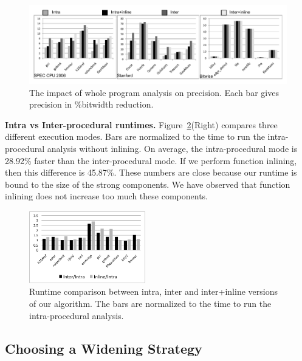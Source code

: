 \documentclass{llncs}
\begin{document}
\begin{figure}[t!]
\begin{center}
\includegraphics[width=\textwidth]{images/wholeImpact}
\end{center}
\caption{\label{fig:wholeImpact}
The impact of whole program analysis on precision. Each bar gives precision in
\%bitwidth reduction.}
\end{figure}

\noindent
\textbf{Intra vs Inter-procedural runtimes.}
Figure~\ref{fig:timeComp}(Right) compares three different execution modes.
Bars are normalized to the time to run the intra-procedural analysis
without inlining.
On average, the intra-procedural mode is 28.92\% faster than the inter-procedural
mode.
If we perform function inlining, then this difference is 45.87\%.
These numbers are close because our runtime is bound to the
size of the strong components.
We have observed that function inlining does not increase too much these
components.

\begin{figure}[t!]
\begin{center}
\includegraphics[width=0.45\textwidth]{images/timeIntraInterInline}
\end{center}
\caption{\label{fig:timeComp}
Runtime comparison between intra, inter and inter+inline versions of
our algorithm.
The bars are normalized to the time to run the intra-procedural analysis.
}
\end{figure}

\subsection{Choosing a Widening Strategy}
\label{sub:widen}
\end{document}
